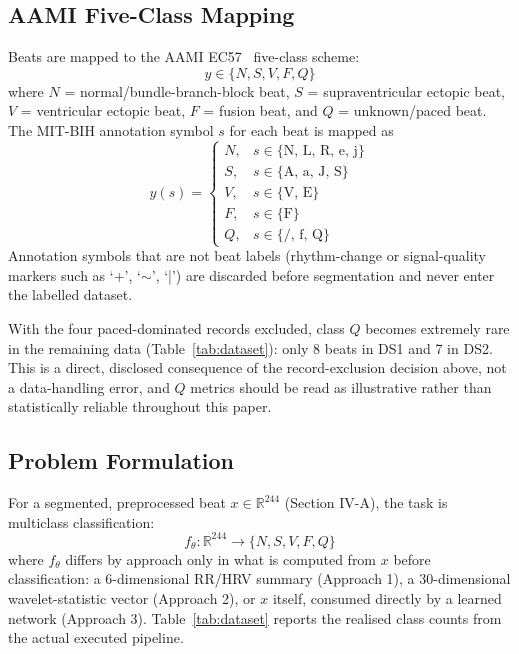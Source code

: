 \documentclass[conference]{IEEEtran}
\begin{document}
\subsection{AAMI Five-Class Mapping}

Beats are mapped to the AAMI EC57~\cite{aami2012ec57} five-class scheme:
\begin{equation}
y \in \{N, S, V, F, Q\}
\end{equation}
where $N$ = normal/bundle-branch-block beat, $S$ = supraventricular
ectopic beat, $V$ = ventricular ectopic beat, $F$ = fusion beat, and $Q$ =
unknown/paced beat. The MIT-BIH annotation symbol $s$ for each beat is
mapped as
\begin{equation}
y(s) = \begin{cases}
N, & s \in \{\text{N, L, R, e, j}\} \\
S, & s \in \{\text{A, a, J, S}\} \\
V, & s \in \{\text{V, E}\} \\
F, & s \in \{\text{F}\} \\
Q, & s \in \{\text{/, f, Q}\}
\end{cases}
\end{equation}
Annotation symbols that are not beat labels (rhythm-change or
signal-quality markers such as `+', `$\sim$', `|') are discarded before
segmentation and never enter the labelled dataset.

With the four paced-dominated records excluded, class $Q$ becomes
extremely rare in the remaining data (Table~\ref{tab:dataset}): only 8
beats in DS1 and 7 in DS2. This is a direct, disclosed consequence of the
record-exclusion decision above, not a data-handling error, and $Q$
metrics should be read as illustrative rather than statistically reliable
throughout this paper.

\subsection{Problem Formulation}

For a segmented, preprocessed beat $x \in \mathbb{R}^{244}$ (Section
IV-A), the task is multiclass classification:
\begin{equation}
f_\theta : \mathbb{R}^{244} \rightarrow \{N, S, V, F, Q\}
\end{equation}
where $f_\theta$ differs by approach only in what is computed from $x$
before classification: a 6-dimensional RR/HRV summary (Approach 1), a
30-dimensional wavelet-statistic vector (Approach 2), or $x$ itself,
consumed directly by a learned network (Approach 3). Table~\ref{tab:dataset}
reports the realised class counts from the actual executed pipeline.
\end{document}

